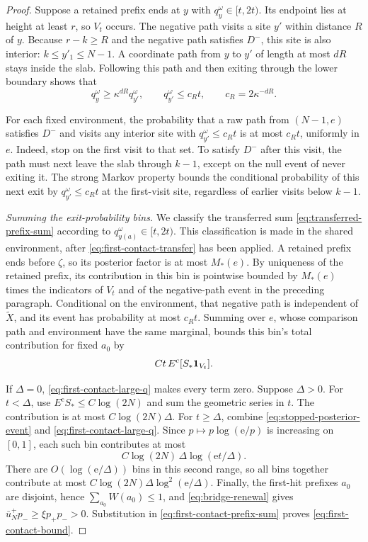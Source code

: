 \begin{proof}
Suppose a retained prefix ends at \(y\) with
\(q_y^\omega\in[t,2t)\).  Its endpoint lies at height at least
\(r\), so \(V_t\) occurs.  The negative path visits a site \(y'\)
within distance \(R\) of \(y\).  Because \(r-k\ge R\) and the
negative path satisfies \(D^-\), this site is also interior:
\(k\le y'_1\le N-1\).  A coordinate path from \(y\) to \(y'\)
of length at most \(dR\) stays inside the slab.  Following this path
and then exiting through the lower boundary shows that
\[
 q_y^\omega\ge\kappa^{dR}q_{y'}^\omega,
 \qquad q_{y'}^\omega\le c_Rt,
 \qquad c_R=2\kappa^{-dR}.
\]

For each fixed environment, the probability that a raw path from
\((N-1,e)\) satisfies \(D^-\) and visits any interior site with
\(q_{y'}^\omega\le c_Rt\) is at most \(c_Rt\), uniformly in \(e\).
Indeed, stop on the first visit to that set.  To satisfy \(D^-\)
after this visit, the path must next leave the slab through \(k-1\),
except on the null event of never exiting it.  The strong Markov property
bounds the conditional probability of this next exit by
\(q_{y'}^\omega\le c_Rt\) at the first-visit site, regardless of
earlier visits below \(k-1\).

\emph{Summing the exit-probability bins.}
We classify the transferred sum
\eqref{eq:transferred-prefix-sum} according to
\(q_{y(a)}^\omega\in[t,2t)\).  This classification is made in the
shared environment, after \eqref{eq:first-contact-transfer} has been
applied.  A retained prefix ends before \(\zeta\), so its posterior
factor is at most \(M_*(e)\).  By uniqueness of the retained prefix,
its contribution in this bin is pointwise bounded by \(M_*(e)\)
times the indicators of \(V_t\) and of the negative-path event in
the preceding paragraph.  Conditional on the environment, that
negative path is independent of \(\widetilde X\), and its event has
probability at most \(c_Rt\).  Summing over \(e\), whose comparison
path and environment have the same marginal, bounds this bin's total
contribution for fixed \(a_0\) by
\begin{equation}\label{eq:first-contact-bin}
 Ct\,E^{\mathrm c}[S_*\mathbf 1_{V_t}].
\end{equation}

If \(\Delta=0\), \eqref{eq:first-contact-large-q} makes every term
zero.  Suppose \(\Delta>0\).  For \(t<\Delta\), use
\(E^{\mathrm c}S_*\le C\log(2N)\) and sum the geometric series in
\(t\).  The contribution is at most \(C\log(2N)\Delta\).
For \(t\ge\Delta\), combine
\eqref{eq:stopped-posterior-event} and
\eqref{eq:first-contact-large-q}.  Since
\(p\mapsto p\log(\mathrm e/p)\) is increasing on \([0,1]\), each
such bin contributes at most
\[
 C\log(2N)\,\Delta\log(\mathrm e t/\Delta).
\]
There are \(O(\log(\mathrm e/\Delta))\) bins in this second range,
so all bins together contribute at most
\(C\log(2N)\Delta\log^2(\mathrm e/\Delta)\).
Finally, the first-hit prefixes \(a_0\) are disjoint, hence
\(\sum_{a_0}W(a_0)\le1\), and
\eqref{eq:bridge-renewal} gives
\(\bar u_N^+p_-\ge\xi p_+p_->0\).
Substitution in \eqref{eq:first-contact-prefix-sum} proves
\eqref{eq:first-contact-bound}.
\end{proof}
